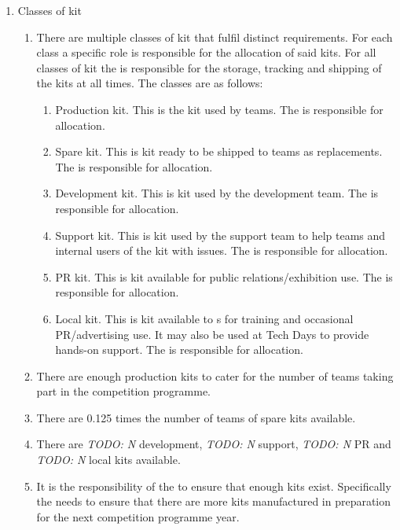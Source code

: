 \begin{enumerate}
\item Classes of kit
  \begin{enumerate}
    \item There are multiple classes of kit that fulfil distinct requirements. For each class a specific role is responsible for the allocation of said kits. For all classes of kit the  is responsible for the storage, tracking and shipping of the kits at all times. The classes are as follows:
      \begin{enumerate}
        \item Production kit. This is the kit used by teams. The  is responsible for allocation.
        \item Spare kit. This is kit ready to be shipped to teams as replacements. The  is responsible for allocation.
        \item Development kit. This is kit used by the development team.  The  is responsible for allocation.
        \item Support kit. This is kit used by the support team to help teams and internal users of the kit with issues. The  is responsible for allocation.
        \item PR kit. This is kit available for public relations/exhibition use. The  is responsible for allocation.
        \item Local kit. This is kit available to s for training and occasional PR/advertising use. It may also be used at Tech Days to provide hands-on support. The  is responsible for allocation.
      \end{enumerate}
    \item There are enough production kits to cater for the number of teams taking part in the competition programme.
    \item There are 0.125 times the number of teams of spare kits available.
    \item There are \emph{TODO: N} development, \emph{TODO: N} support, \emph{TODO: N} PR and \emph{TODO: N} local kits available.
    \item It is the responsibility of the  to ensure that enough kits exist. Specifically the  needs to ensure that there are more kits manufactured in preparation for the next competition programme year.
  \end{enumerate}
\end{enumerate}
